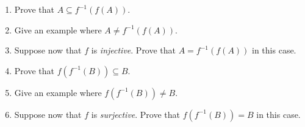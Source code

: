 \documentclass[letterpaper,12pt]{article}
\begin{document}
\begin{enumerate}
\begin{enumerate}
 \item Prove that $A\subseteq f^{-1}(f(A))$.
 \item Give an example where $A\neq f^{-1}(f(A))$.
 \item Suppose now that $f$ is \textit{injective}. Prove that $A=f^{-1}(f(A))$ in this case.
 \item Prove that $f(f^{-1}(B))\subseteq B$.
 \item Give an example where $f(f^{-1}(B))\neq B$.
 \item Suppose now that $f$ is \textit{surjective}. Prove that $f(f^{-1}(B))=B$ in this case.
\end{enumerate}

\end{enumerate}
\end{document}
